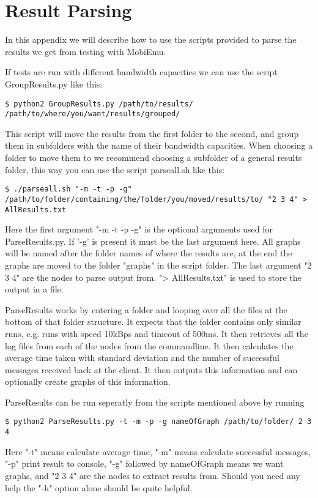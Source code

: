 \section{Result Parsing}\label{Result Parsing}
    In this appendix we will describe how to use the scripts provided to parse the results we get from testing with MobiEmu.
    
    If tests are run with different bandwidth capacities we can use the script GroupResults.py like this:
    \lstset{language=bash, style=shell}
    \begin{lstlisting}
$ python2 GroupResults.py /path/to/results/ /path/to/where/you/want/results/grouped/
    \end{lstlisting}
    This script will move the results from the first folder to the second, and group them in subfolders with the name of their bandwidth capacities. When choosing a folder to move them to we recommend choosing a subfolder of a general results folder, this way you can use the script parseall.sh like this:
    \begin{lstlisting}
$ ./parseall.sh "-m -t -p -g" /path/to/folder/containing/the/folder/you/moved/results/to/ "2 3 4" > AllResults.txt
    \end{lstlisting}
    Here the first argument "-m -t -p -g" is the optional arguments used for ParseResults.py. If '-g' is present it must be the last argument here. All graphs will be named after the folder names of where the results are, at the end the graphs are moved to the folder "graphs" in the script folder. The last argument "2 3 4" are the nodes to parse output from. "> AllResults.txt" is used to store the output in a file.
    
    ParseResults works by entering a folder and looping over all the files at the bottom of that folder structure. It expects that the folder contains only similar runs, e.g. runs with speed 10kBps and timeout of 500ms. It then retrieves all the log files from each of the nodes from the commandline. It then calculates the average time taken with standard deviation and the number of successful messages received back at the client. It then outputs this information and can optionally create graphs of this information.
    
    ParseResults can be run seperatly from the scripts mentioned above by running
    \begin{lstlisting}
$ python2 ParseResults.py -t -m -p -g nameOfGraph /path/to/folder/ 2 3 4
    \end{lstlisting}
    Here "-t" means calculate average time, "-m" means calculate successful messages, "-p" print result to console, "-g" followed by nameOfGraph means we want graphs, and "2 3 4" are the nodes to extract results from. Should you need any help the "-h" option alone should be quite helpful.
